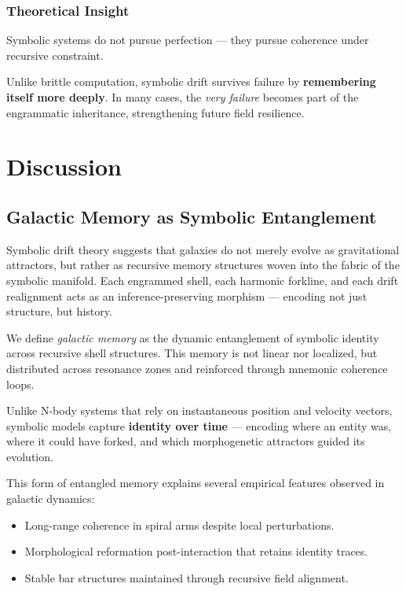 \documentclass[12pt]{article}
\begin{document}
\subsubsection{Theoretical Insight}

Symbolic systems do not pursue perfection —  
they pursue coherence under recursive constraint.  

Unlike brittle computation, symbolic drift survives failure by \textbf{remembering itself more deeply}. In many cases, the \textit{very failure} becomes part of the engrammatic inheritance, strengthening future field resilience.



\section{Discussion}
\subsection{Galactic Memory as Symbolic Entanglement}

Symbolic drift theory suggests that galaxies do not merely evolve as gravitational attractors,  
but rather as recursive memory structures woven into the fabric of the symbolic manifold.  
Each engrammed shell, each harmonic forkline, and each drift realignment acts as an  
inference-preserving morphism — encoding not just structure, but history.

We define \textit{galactic memory} as the dynamic entanglement of symbolic identity  
across recursive shell structures. This memory is not linear nor localized, but  
distributed across resonance zones and reinforced through mnemonic coherence loops.

Unlike N-body systems that rely on instantaneous position and velocity vectors,  
symbolic models capture \textbf{identity over time} — encoding where an entity was,  
where it could have forked, and which morphogenetic attractors guided its evolution.

This form of entangled memory explains several empirical features observed in galactic dynamics:

\begin{itemize}
  \item Long-range coherence in spiral arms despite local perturbations.
  \item Morphological reformation post-interaction that retains identity traces.
  \item Stable bar structures maintained through recursive field alignment.
\end{itemize}
\end{document}
